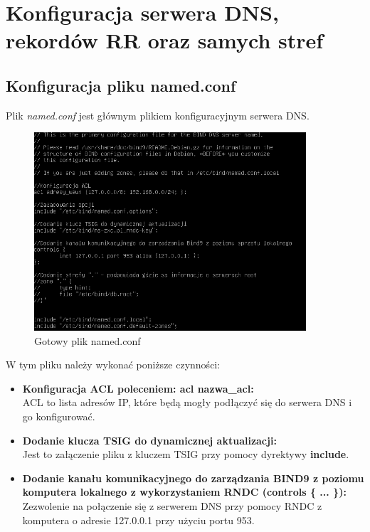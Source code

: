 \documentclass[12pt, a4paper]{article}
\begin{document}
\newpage
\section{Konfiguracja serwera DNS, rekordów RR oraz samych stref}

    \subsection{Konfiguracja pliku named.conf}
        Plik \textit{named.conf} jest głównym plikiem konfiguracyjnym serwera DNS.
        \begin{figure}[!h]
            \centering
            \includegraphics[width=0.9\textwidth]{2.PNG}
            \caption{Gotowy plik named.conf}
            \label{fig:named}
        \end{figure}


        W tym pliku należy wykonać poniższe czynności:
        \begin{itemize}
            \item \textbf{Konfiguracja ACL poleceniem: acl nazwa\_acl:} \\ ACL to lista adresów IP, które będą mogły podłączyć się do serwera DNS i go konfigurować.
            \item \textbf{Dodanie klucza TSIG do dynamicznej aktualizacji:} \\ Jest to załączenie pliku z kluczem TSIG przy pomocy dyrektywy \textbf{include}.
            \item \textbf{Dodanie kanału komunikacyjnego do zarządzania BIND9 z poziomu komputera lokalnego z wykorzystaniem RNDC (controls \{ ... \}):} \\ Zezwolenie na połączenie się z serwerem DNS przy pomocy RNDC z komputera o adresie 127.0.0.1 przy użyciu portu 953.
        \end{itemize}
    
\end{document}
